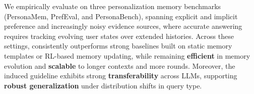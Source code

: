 We empirically evaluate \ourmodel on three personalization memory benchmarks (PersonaMem, PrefEval, and PersonaBench), spanning explicit and implicit preference and increasingly noisy evidence sources, where accurate answering requires tracking evolving user states over extended histories. Across these settings, \ourmodel consistently outperforms strong baselines built on static memory templates or RL-based memory updating, while remaining \textbf{efficient} in memory evolution and \textbf{scalable} to longer contexts and more rounds. Moreover, the induced guideline exhibits strong \textbf{transferability} across LLMs, supporting \textbf{robust generalization} under distribution shifts in query type.


